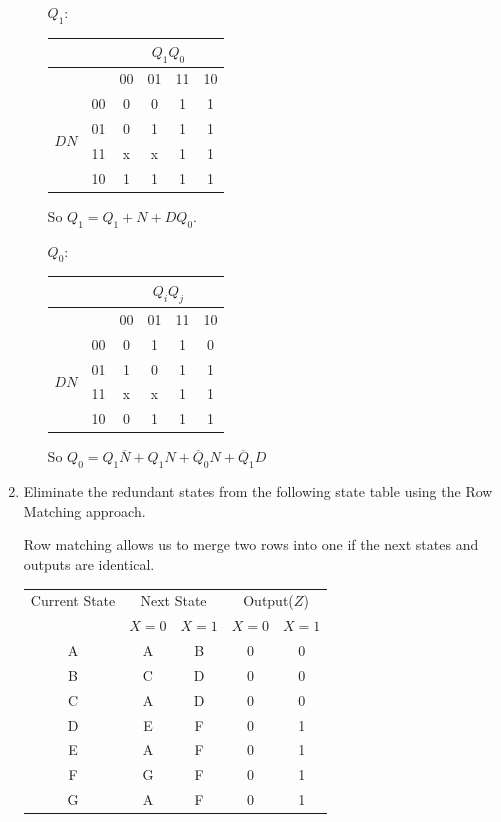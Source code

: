 \documentclass[10pt,\jkfside,a4paper]{article}
\begin{document}
\begin{enumerate}
\begin{enumerate}
$Q_1$:

\begin{center}
\begin{tabular}{|c|c|c|c|c|c|} 
\hline
& & \multicolumn{4}{c|}{$Q_1Q_0$} \\
\hline
& & 00 & 01 & 11 & 10 \\ 
\hline
\multirow{4}{2em}{$DN$} 
& 00 & 0 & 0 & 1 & 1 \\
& 01 & 0 & 1 & 1 & 1 \\
& 11 & x & x & 1 & 1 \\
& 10 & 1 & 1 & 1 & 1 \\
\hline
\end{tabular}
\end{center}

So $Q_1 = Q_1 + N + DQ_0$.

$Q_0$:

\begin{center}
\begin{tabular}{|c|c|c|c|c|c|} 
\hline
& & \multicolumn{4}{c|}{$Q_iQ_j$} \\
\hline
& & 00 & 01 & 11 & 10 \\ 
\hline
\multirow{4}{2em}{$DN$} 
& 00 & 0 & 1 & 1 & 0 \\
& 01 & 1 & 0 & 1 & 1 \\
& 11 & x & x & 1 & 1 \\
& 10 & 0 & 1 & 1 & 1 \\
\hline
\end{tabular}
\end{center}

So $Q_0 = Q_1\overline N + Q_1N + \overline Q_0N + \overline Q_1D$

\end{enumerate}

\item{Eliminate the redundant states from the following state table using the Row Matching approach.}

Row matching allows us to merge two rows into one if the next states and outputs are identical.

\begin{tabular}{c|c c|c c}
Current State & \multicolumn{2}{|c|}{Next State} & \multicolumn{2}{c}{Output($Z$)}\\
  & $X=0$ & $X=1$ & $X=0$ & $X=1$\\
\hline
A & A & B & 0 & 0\\
B & C & D & 0 & 0\\
C & A & D & 0 & 0\\
D & E & F & 0 & 1\\
E & A & F & 0 & 1\\
F & G & F & 0 & 1\\
G & A & F & 0 & 1\\
\end{tabular}


\end{enumerate}
\end{document}

